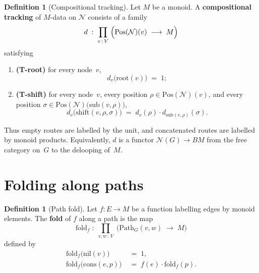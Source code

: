 \documentclass[11pt,a4paper]{article}
\theoremstyle{plain}
\theoremstyle{definition}
\newtheorem{definition}[theorem]{Definition}
\newcommand{\Pos}{\mathrm{Pos}}
\newcommand{\rootpos}{\mathrm{root}}
\newcommand{\sub}{\mathrm{sub}}
\newcommand{\shift}{\mathrm{shift}}
\begin{document}
\begin{definition}[Compositional tracking]\label{def:tracking}
Let $M$ be a monoid. A \textbf{compositional tracking} of $M$-data on
$\mathcal{N}$ consists of a family
\begin{equation}
  d \;:\; \prod_{v \,:\, V}\;
    \Bigl(\Pos(\mathcal{N})(v) \;\longrightarrow\; M\Bigr)
\end{equation}
satisfying
\begin{enumerate}
  \item \textbf{(T-root)} for every node~$v$,
        \[
          d_v\bigl(\rootpos(v)\bigr) \;=\; 1;
        \]
  \item \textbf{(T-shift)} for every node~$v$, every position
        $\rho \in \Pos(\mathcal{N})(v)$, and every position
        $\sigma \in \Pos(\mathcal{N})\bigl(\sub(v,\rho)\bigr)$,
        \[
          d_v\bigl(\shift(v,\rho,\sigma)\bigr)
          \;=\;
          d_v(\rho) \cdot d_{\sub(v,\rho)}(\sigma).
        \]
\end{enumerate}
\end{definition}

Thus empty routes are labelled by the unit, and concatenated routes are labelled
by monoid products. Equivalently, $d$ is a functor $\mathcal{N}(G) \to BM$ from
the free category on~$G$ to the delooping of~$M$.

\section{Folding along paths}

\begin{definition}[Path fold]\label{def:fold}
Let $f : E \to M$ be a function labelling edges by monoid elements. The
\textbf{fold} of $f$ along a path is the map
\begin{equation}
  \mathrm{fold}_f \;:\;
  \prod_{v,w \,:\, V}\;
    \bigl(\mathrm{Path}_G(v,w) \;\longrightarrow\; M\bigr)
\end{equation}
defined by
\begin{align}
  \mathrm{fold}_f\bigl(\mathrm{nil}(v)\bigr) &\;=\; 1, \\
  \mathrm{fold}_f\bigl(\mathrm{cons}(e,p)\bigr)
  &\;=\;
  f(e) \cdot \mathrm{fold}_f(p).
\end{align}
\end{definition}
\end{document}
